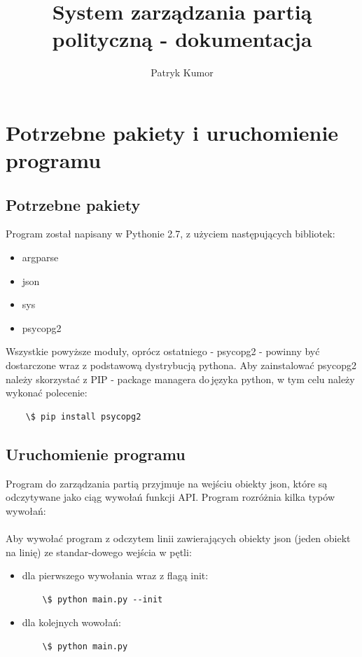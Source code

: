 \documentclass{article}
\title{System zarządzania partią polityczną - dokumentacja}
\author{Patryk Kumor}
\begin{document}
  \maketitle
  \newpage
  \tableofcontents
  \newpage


\section{Potrzebne pakiety i uruchomienie programu}

\subsection{ Potrzebne pakiety } 

Program został napisany w Pythonie 2.7, z użyciem następujących bibliotek: 
\begin{itemize}
    \item argparse 
    \item json 
    \item sys 
    \item psycopg2 
\end{itemize}
Wszystkie powyższe moduły, oprócz ostatniego - psycopg2 - powinny być dostarczone wraz z podstawową dystrybucją pythona. \newline
Aby zainstalować psycopg2 należy skorzystać z PIP - package managera do\,języka python, w tym celu należy wykonać polecenie:
\begin{verbatim}
    \$ pip install psycopg2
\end{verbatim}

\subsection{ Uruchomienie programu }  
Program do zarządzania partią przyjmuje na wejściu obiekty json, które są odczytywane jako ciąg wywołań funkcji API. \newline
Program rozróżnia kilka typów wywołań: 

\paragraph{}  
Aby wywołać program z odczytem linii zawierających obiekty json (jeden obiekt na linię) ze\,\,standar-dowego wejścia w pętli:
\begin{itemize}
\item dla pierwszego wywołania wraz z flagą init:
\begin{verbatim}
    \$ python main.py --init
\end{verbatim}
\item dla kolejnych wowołań:
\begin{verbatim}
    \$ python main.py 
\end{verbatim}
\end{itemize}
\end{document}
